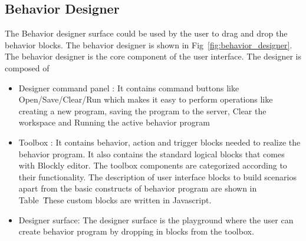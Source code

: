 \subsection*{Behavior Designer} The Behavior designer surface could be used by the user to drag and drop the behavior blocks. The behavior designer is shown in Fig~\ref{fig:behavior_designer}.
The behavior designer is the core component of the user interface. The designer is composed of 
\begin{itemize}
\item Designer command panel : It contains command buttons like Open/Save/Clear/Run which makes it easy to perform operations like creating a new program, saving the program to the server, Clear the workspace and Running the active behavior program
\item Toolbox : It contains behavior, action and trigger blocks needed to realize the behavior program. It also contains the standard logical blocks that comes with Blockly editor. The toolbox components are categorized according to their functionality. The description of user interface blocks to build scenarios apart from the basic constructs of behavior program are shown in Table~\. These custom blocks are written in Javascript.
\item Designer surface: The designer surface is the playground where the user can create behavior program by dropping in blocks from the toolbox.
\end{itemize}
